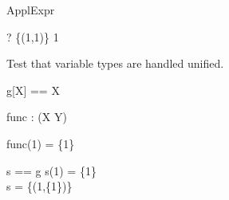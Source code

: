 \begin{zsection}
  \SECTION ApplExpr
\end{zsection}

\begin{zed} \vdash? \{(1,1)\} 1 \in \nat \end{zed}

Test that variable types are handled unified.
\begin{zed}
  g[X] == X
\end{zed}

\begin{gendef}[X,Y]
  func : \power (X \cross Y)
\end{gendef}

\begin{axdef}
\where
  func(1) = \{1\}
\end{axdef}

\begin{axdef}
  s == g
\where
  s(1) = \{1\}\\
  s = \{(1,\{1\})\}
\end{axdef}
